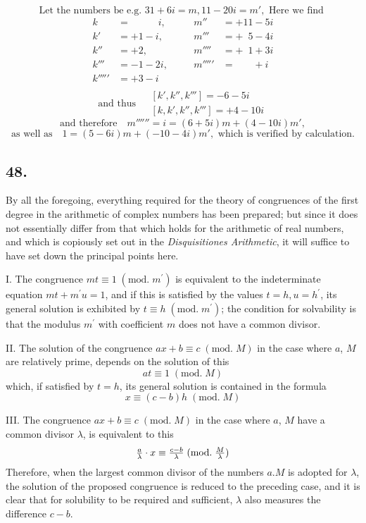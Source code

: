 \documentclass[twoside,12pt, showframe]{memoir}
\renewcommand{\pmod}[1]{\;(\textrm{mod.}\;#1)}
\let\oldfrac\frac
\def\frac#1#2{\mathchoice{\tfrac{#1}{#2}}{\oldfrac{#1}{#2}}{\genfrac{}{}{}{2}{#1}{#2\mathstrut}}{\genfrac{}{}{}{3}{#1}{#2\mathstrut}}}
\begin{document}
\[\text{Let the numbers be e.g. } 31+6i=m, 11-20i=m', \text{ Here we find } \]
\[
\begin{array}{clccl}
k&=\phantom{+1-\;} i,&\quad& m''&=+11-5i \\
k'&=+1-i, &\quad& m'''&=+\phantom{0}5-4i \\
k''&=+2, &\quad& m''''&=+\phantom{0}1+3i \\
k'''&=-1-2i, &\quad& m'''''&=\phantom{+00}+i \\
k'''''&=+3-i &\quad& \\
\end{array}
\]
\[\text{and thus } 
\begin{aligned}
& {\left[k', k'', k'''\right]=-6-5i} \\
& {\left[k, k', k'', k'''\right]=+4-10i}
\end{aligned}
\]
\[\text{and therefore} \quad m''''''=i=(6+5i)m+(4-10i)m', \]
\[\text{as well as} \quad 1=(5-6i)m+(-10-4i)m', \text{ which is verified by calculation.}\]
%

\subsection*{48.}

By all the foregoing, everything required for the theory of congruences of the first degree in the arithmetic of complex numbers has been prepared; but since it does not essentially differ from that which holds for the arithmetic of real numbers, and which is copiously set out in the \textit{Disquisitiones Arithmetic}, it will suffice to have set down the principal points here.

I. The congruence \(m t \equiv 1\pmod{m^{\prime}}\) is equivalent to the indeterminate equation \(m t+m^{\prime} u=1\), and if this is satisfied by the values \(t=h, u=h^{\prime}\), its general solution is exhibited by \(t \equiv h\pmod{m^{\prime}}\); the condition for solvability is that the modulus \(m^{\prime}\) with coefficient \(m\) does not have a common divisor.

II. The solution of the congruence \(a x+b \equiv c\pmod{M}\) in the case where \(a\), \(M\) are relatively prime, depends on the solution of this
\[a t \equiv 1\pmod{M}\]
which, if satisfied by \(t=h\), its general solution is contained in the formula
\[x \equiv(c-b) h\pmod{M}\]

III. The congruence \(a x+b \equiv c\pmod{M}\) in the case where \(a\), \(M\) have a common divisor \(\lambda\), is equivalent to this
\[\frac{a}{\lambda} \cdot x \equiv \frac{c-b}{\lambda}\pmod{\frac{M}{\lambda}}\]
Therefore, when the largest common divisor of the numbers \(a . M\) is adopted for \(\lambda\), the solution of the proposed congruence is reduced to the preceding case, and it is clear that for solubility to be required and sufficient, \(\lambda\) also measures the difference \(c-b\).
%
\end{document}
